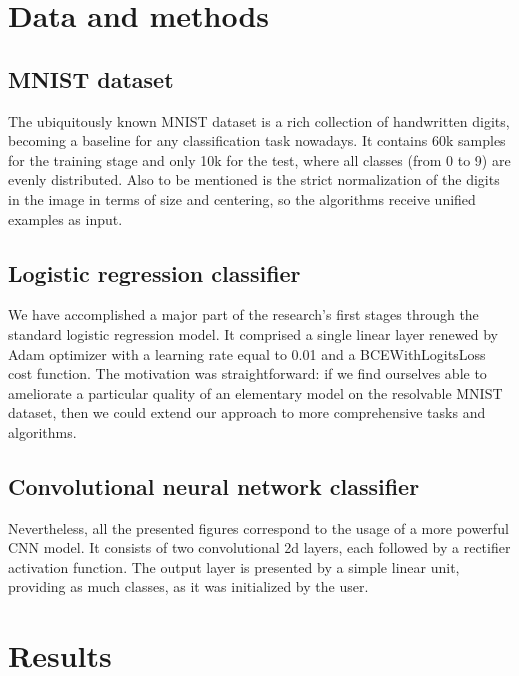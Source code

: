 \documentclass{article}
\begin{document}
\section{Data and methods}
\subsection{MNIST dataset}
The ubiquitously known MNIST dataset is a rich collection of handwritten digits, becoming a baseline for any classification task nowadays. It contains 60k samples for the training stage and only 10k for the test, where all classes (from 0 to 9) are evenly distributed. Also to be mentioned is the strict normalization of the digits in the image in terms of size and centering, so the algorithms receive unified examples as input.
\subsection{Logistic regression classifier}
We have accomplished a major part of the research's first stages through the standard logistic regression model. It comprised a single linear layer renewed by Adam optimizer with a learning rate equal to 0.01 and a BCEWithLogitsLoss cost function. The motivation was straightforward: if we find ourselves able to ameliorate a particular quality of an elementary model on the resolvable MNIST dataset, then we could extend our approach to more comprehensive tasks and algorithms.

\subsection{Convolutional neural network classifier}
Nevertheless, all the presented figures correspond to the usage of a more powerful CNN model. It consists of two convolutional 2d layers, each followed by a rectifier activation function. The output layer is presented by a simple linear unit, providing as much classes, as it was initialized by the user.   


\section{Results}
\end{document}
